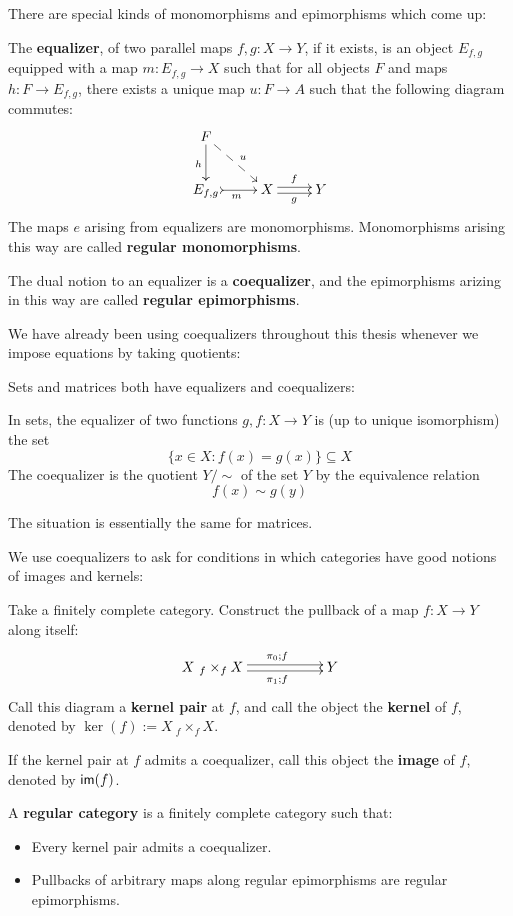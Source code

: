 There are  special kinds of monomorphisms and epimorphisms which come up:
\begin{definition}
The {\bf equalizer}, of two parallel maps $f,g:X\to Y$, if it exists, is an object $E_{f,g}$ equipped with a map $m:E_{f,g}\to X$ such that for all objects $F$ and maps $h:F\to E_{f,g}$, there exists a unique map $u:F\to A$ such that the following diagram commutes:
$$
\xymatrix{
    F \ar@{-->}[dr]^{u} \ar[d]_h
  \\ E_{f,g} \ar@{>->}[r]_m
    & X \ar@<-.5ex>[r]_g \ar@<.5ex>[r]^f
    & Y
}
$$
The maps $e$ arising from equalizers are monomorphisms.  Monomorphisms arising this way are called {\bf regular monomorphisms}.

The dual notion to an equalizer is a {\bf coequalizer}, and the epimorphisms arizing in this way are called {\bf regular epimorphisms}.
\end{definition}
We have already been using coequalizers throughout this thesis whenever we impose equations by taking quotients:
\begin{example}
Sets and matrices both have equalizers and coequalizers:

In sets, the equalizer of two functions $g,f:X\to Y$ is (up to unique isomorphism) the set 
$$\{x \in X:f(x)=g(x)\} \subseteq X$$
The coequalizer is the quotient $Y/\sim$   of the set $Y$ by the equivalence relation 
$$f(x)\sim g(y)$$

The situation is essentially the same for matrices.
\end{example}
We  use coequalizers to ask for conditions in which categories have good notions of images and kernels:
\begin{definition}
Take a finitely complete category.  Construct the pullback of a map $f:X\to Y$ along itself:
 $$\xymatrix{X\ {}_f \times_f X  \ar@<-.5ex>[rr]_{\ \ \pi_1;f}  \ar@<.5ex>[rr]^{\ \ \pi_0;f}&& Y}$$
Call this diagram a {\bf kernel pair} at $f$, and call the object  the {\bf kernel} of $f$, denoted by $\ker(f):=X\ {}_f \times_f X$.

If the kernel pair at $f$ admits a coequalizer, call this object the {\bf image} of $f$, denoted by $\mathsf{im}(f)$.

A {\bf regular category} is a finitely complete category such that:
\begin{itemize}
\item Every kernel pair admits a coequalizer.
\item Pullbacks of arbitrary maps along regular epimorphisms are regular epimorphisms.
\end{itemize}
\end{definition}
